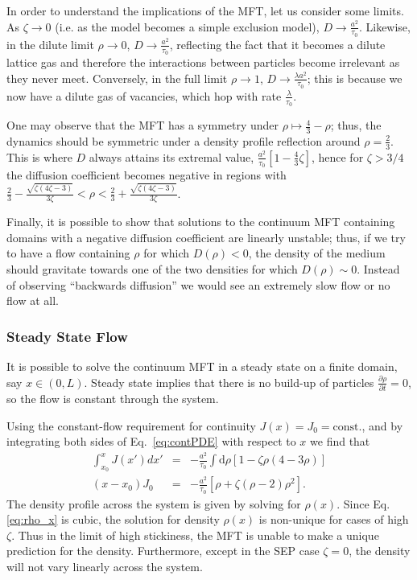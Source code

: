 \documentclass[
reprint, amsmath,amssymb,
]{revtex4-1}
\newcommand{\partDeriv}[2]{\frac{\partial #1}{\partial #2}}
\begin{document}
In order to understand the implications of the MFT, let us consider
some limits. As $\zeta \rightarrow 0$ (i.e. as the model becomes a
simple exclusion model), $D \rightarrow \frac{a^2}{\tau_0}$. Likewise,
in the dilute limit $\rho \rightarrow 0$, $D \rightarrow \frac{
  a^2}{\tau_0}$, reflecting the fact that it becomes a dilute lattice
gas and therefore the interactions between particles become irrelevant
as they never meet.  Conversely, in the full limit $\rho \rightarrow
1$, $D \rightarrow \frac{\lambda a^2}{\tau_0}$; this is because we now
have a dilute gas of vacancies, which hop with rate
$\frac{\lambda}{\tau_0}$.  

One may observe that the 
MFT has a symmetry under $\rho \mapsto \frac{4}{3} - \rho$; thus, the
dynamics should be symmetric under a density profile reflection around
$\rho = \frac{2}{3}$. This is where $D$ always attains its extremal
value, $ \frac{a^2}{\tau_0}\left[1 - \frac{4}{3}\zeta\right]$, hence
for $\zeta>3/4$ the diffusion coefficient becomes negative in regions
with $\frac{2}{3} - \frac{\sqrt{\zeta\left(4\zeta - 3\right)}}{3\zeta}
< \rho < \frac{2}{3} + \frac{\sqrt{\zeta\left(4\zeta -
    3\right)}}{3\zeta}$. 

Finally, it is possible to show that
solutions to the continuum MFT containing domains with a negative
diffusion coefficient are linearly unstable; thus, if we try to have a
flow containing $\rho$ for which $D(\rho)<0$, the density of the
medium should gravitate towards one of the two densities for which $D(\rho)\sim
0$. Instead of observing ``backwards diffusion'' we would see an
extremely slow flow or no flow at all. 

\subsubsection{Steady State Flow}

It is possible to solve the continuum MFT in a steady state on a
finite domain, say $x\in(0, L)$. Steady state implies that there is no
build-up of particles $\partDeriv{\rho}{t}=0$, so the flow is constant through the system.

Using the constant-flow requirement for continuity
$J(x)=J_0=\mathrm{const.}$, and by integrating both sides of
Eq.~\ref{eq:contPDE} with respect to $x$ we find that
\begin{eqnarray}
 \int_{x_0}^x J(x')dx' &=& -\frac{a^2}{\tau_0} \int \! \! \mathrm{d} \rho \left[1 - \zeta
   \rho\left(4-3\rho\right) \right]\\ (x-x_0)J_0 & = & -\frac{a^2}{\tau_0}\left[ \rho + \zeta (\rho -
 2) \rho^2 \right ].
\label{eq:rho_x}
\end{eqnarray}
The density profile across the system is given by solving for
$\rho(x)$.  Since Eq.\ref{eq:rho_x} is cubic, the solution for density
$\rho(x)$ is non-unique for cases of high $\zeta$.  Thus in the limit of
high stickiness, the MFT is unable to make a unique prediction for the
density.  Furthermore, except in the SEP case $\zeta=0$, the density
will not vary linearly across the system.
\end{document}
